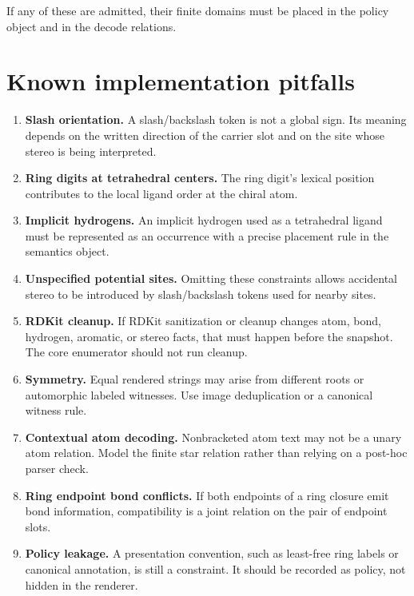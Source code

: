 \documentclass[10pt,a4paper]{article}
\theoremstyle{definition}
\theoremstyle{remark}
\begin{document}
If any of these are admitted, their finite domains must be placed in the policy
object and in the decode relations.

\section{Known implementation pitfalls}
\label{s:pitfalls}

\begin{enumerate}[leftmargin=*]
\item \textbf{Slash orientation.}  A slash/backslash token is not a global sign.
      Its meaning depends on the written direction of the carrier slot and on
      the site whose stereo is being interpreted.
\item \textbf{Ring digits at tetrahedral centers.}  The ring digit's lexical
      position contributes to the local ligand order at the chiral atom.
\item \textbf{Implicit hydrogens.}  An implicit hydrogen used as a tetrahedral
      ligand must be represented as an occurrence with a precise placement rule
      in the semantics object.
\item \textbf{Unspecified potential sites.}  Omitting these constraints allows
      accidental stereo to be introduced by slash/backslash tokens used for
      nearby sites.
\item \textbf{RDKit cleanup.}  If RDKit sanitization or cleanup changes atom,
      bond, hydrogen, aromatic, or stereo facts, that must happen before the
      snapshot.  The core enumerator should not run cleanup.
\item \textbf{Symmetry.}  Equal rendered strings may arise from different roots
      or automorphic labeled witnesses.  Use image deduplication or a canonical
      witness rule.
\item \textbf{Contextual atom decoding.}  Nonbracketed atom text may not be a
      unary atom relation.  Model the finite star relation rather than relying
      on a post-hoc parser check.
\item \textbf{Ring endpoint bond conflicts.}  If both endpoints of a ring
      closure emit bond information, compatibility is a joint relation on the
      pair of endpoint slots.
\item \textbf{Policy leakage.}  A presentation convention, such as least-free
      ring labels or canonical annotation, is still a constraint.  It should be
      recorded as policy, not hidden in the renderer.
\end{enumerate}
\end{document}
